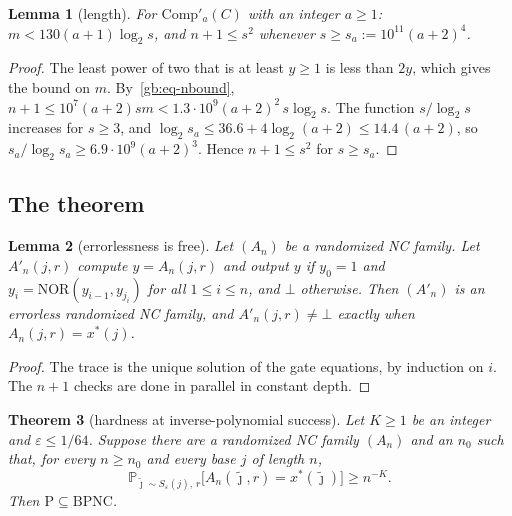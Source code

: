 \documentclass[11pt]{amsart}
\newtheorem{theorem}{Theorem}
\newtheorem{lemma}[theorem]{Lemma}
\theoremstyle{definition}
\theoremstyle{remark}
\newcommand{\eps}{\varepsilon}
\newcommand{\jt}{\tilde{\jmath}}
\newcommand{\NOR}{\mathrm{NOR}}
\newcommand{\PP}{\mathbb{P}}
\newcommand{\Comp}{\mathrm{Comp}}
\begin{document}
\begin{lemma}[length]\label{lem:param}
For $\Comp'_a(C)$ with an integer $a\ge1$: $m<130(a+1)\log_2s$, and $n+1\le s^2$ whenever
$s\ge s_a:=10^{11}(a+2)^4$.
\end{lemma}

\begin{proof}
The least power of two that is at least $y\ge1$ is less than $2y$, which gives the bound on $m$.
By~\eqref{gb:eq-nbound}, $n+1\le10^7(a+2)sm<1.3\cdot10^9(a+2)^2\,s\log_2s$. The function
$s/\log_2s$ increases for $s\ge3$, and $\log_2s_a\le36.6+4\log_2(a+2)\le14.4\,(a+2)$, so
$s_a/\log_2s_a\ge6.9\cdot10^9(a+2)^3$. Hence $n+1\le s^2$ for $s\ge s_a$.
\end{proof}

\subsection{The theorem}

\begin{lemma}[errorlessness is free]\label{lem:errorless}
Let $(A_n)$ be a randomized NC family. Let $A'_n(j,r)$ compute $y=A_n(j,r)$ and output $y$ if
$y_0=1$ and $y_i=\NOR(y_{i-1},y_{j_i})$ for all $1\le i\le n$, and $\bot$ otherwise. Then $(A'_n)$
is an errorless randomized NC family, and $A'_n(j,r)\ne\bot$ exactly when $A_n(j,r)=x^*(j)$.
\end{lemma}

\begin{proof}
The trace is the unique solution of the gate equations, by induction on $i$. The $n+1$ checks
are done in parallel in constant depth.
\end{proof}

\begin{theorem}[hardness at inverse-polynomial success]\label{thm:hard}
Let $K\ge1$ be an integer and $\eps\le1/64$. Suppose there are a randomized NC family $(A_n)$
and an $n_0$ such that, for every $n\ge n_0$ and every base $j$ of length $n$,
\[
\PP_{\jt\sim S_\eps(j),\,r}\bigl[A_n(\jt,r)=x^*(\jt)\bigr]\ge n^{-K}.
\]
Then $\mathrm P\subseteq\mathrm{BPNC}$.
\end{theorem}
\end{document}
